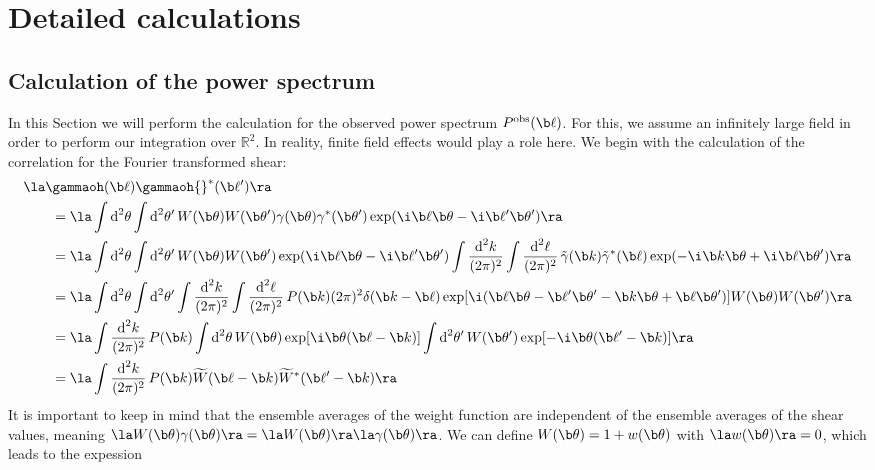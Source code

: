 \chapter{Detailed calculations}
\section{Calculation of the power spectrum}
In this Section we will perform the calculation for the observed power spectrum $P^{\text{obs}}(\b \ell)$. For this, we assume an infinitely large field in order to perform our integration over $\mathbb{R}^2$. In reality, finite field effects would play a role here. We begin with the calculation of the correlation for the Fourier transformed shear:
\begin{align}
& \la \gammaoh(\b \ell) \gammaoh {}^*(\b \ell')\ra\nonumber\\
 &\qquad = \la\int\text{d}^2 \theta\int\text{d}^2 \theta'\,W(\b \theta)W(\b \theta')\gamma(\b \theta)\gamma^*(\b \theta')\exp(\i \b \ell\b \theta-\i \b \ell'\b \theta')\ra\nonumber\\
 &\qquad = \la\int\text{d}^2 \theta\int\text{d}^2 \theta'\,W(\b \theta)W(\b \theta')\exp(\i \b \ell\b \theta-\i \b \ell'\b \theta') \int \frac{\text{d}^2 k}{(2\pi)^2}\int \frac{\text{d}^2 \ell}{(2\pi)^2}\, \tilde{\gamma}(\b k)\tilde{\gamma}^*(\b \ell)\exp(-\i \b k\b \theta+\i \b \ell\b \theta')\ra \nonumber\\
&\qquad = \la \int \text{d}^2 \theta \int \text{d}^2 \theta' \int \frac{\text{d}^2 k}{(2\pi)^2} \int \frac{\text{d}^2 \ell}{(2\pi)^2}\, P(\b k)(2\pi)^2 \delta(\b k-\b \ell) \exp[\i (\b \ell\b \theta-\b \ell'\b \theta'-\b k\b \theta+\b \ell\b \theta')]W(\b \theta)W(\b \theta')\ra \nonumber\\
  &\qquad = \la \int \frac{\text{d}^2 k}{(2\pi)^2} \, P(\b k) \int \text{d}^2 \theta\, W(\b \theta)\exp[\i\b \theta(\b \ell-\b k)]\int \text{d}^2 \theta'\, W(\b \theta') \exp[-\i\b \theta(\b \ell'-\b k)] \ra \nonumber\\
  &\qquad = \la \int\frac{\text{d}^2 k}{(2\pi)^2} \, P(\b k)\widetilde{W}(\b \ell-\b k)\widetilde{W}^* (\b \ell'-\b k)\ra
\end{align}
It is important to keep in mind that the ensemble averages of the weight function are independent of the ensemble averages of the shear values, meaning $\la W(\b \theta)\gamma(\b \theta)\ra = \la W(\b \theta)\ra \la \gamma(\b \theta)\ra$. We can define $W(\b \theta)=1+w(\b\theta)$ with $\la w(\b \theta)\ra = 0$, which leads to the expession
